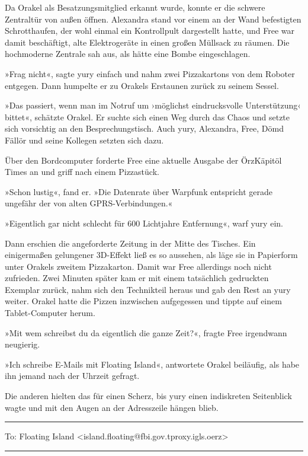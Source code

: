 Da Orakel als Besatzungsmitglied erkannt wurde, konnte er die schwere Zentraltür von außen öffnen. Alexandra stand vor einem an der Wand befestigten Schrotthaufen, der wohl einmal ein Kontrollpult dargestellt hatte, und Free war damit beschäftigt, alte Elektrogeräte in einen großen Müllsack zu räumen. Die hochmoderne Zentrale sah aus, als hätte eine Bombe eingeschlagen.

»Frag nicht«, sagte yury einfach und nahm zwei Pizzakartons von dem Roboter entgegen. Dann humpelte er zu Orakels Erstaunen zurück zu seinem Sessel.

»Das passiert, wenn man im Notruf um ›möglichst eindrucksvolle Unterstützung‹ bittet«, schätzte Orakel. Er suchte sich einen Weg durch das Chaos und setzte sich vorsichtig an den Besprechungstisch. Auch yury, Alexandra, Free, Dömd Fällör und seine Kollegen setzten sich dazu.

Über den Bordcomputer forderte Free eine aktuelle Ausgabe der ÖrzKäpitöl Times an und griff nach einem Pizzastück.

»Schon lustig«, fand er. »Die Datenrate über Warpfunk entspricht gerade ungefähr der von alten GPRS-Verbindungen.«

»Eigentlich gar nicht schlecht für 600 Lichtjahre Entfernung«, warf yury ein.

Dann erschien die angeforderte Zeitung in der Mitte des Tisches. Ein einigermaßen gelungener 3D-Effekt ließ es so aussehen, als läge sie in Papierform unter Orakels zweitem Pizzakarton. Damit war Free allerdings noch nicht zufrieden. Zwei Minuten später kam er mit einem tatsächlich gedruckten Exemplar zurück, nahm sich den Technikteil heraus und gab den Rest an yury weiter. Orakel hatte die Pizzen inzwischen aufgegessen und tippte auf einem Tablet-Computer herum.

»Mit wem schreibst du da eigentlich die ganze Zeit?«, fragte Free irgendwann neugierig.

»Ich schreibe E-Mails mit Floating Island«, antwortete Orakel beiläufig, als habe ihn jemand nach der Uhrzeit gefragt.

Die anderen hielten das für einen Scherz, bis yury einen indiskreten Seitenblick wagte und mit den Augen an der Adresszeile hängen blieb.

\noindent \parbox{\textwidth}{ \vspace{3ex} \hrule \vspace{3ex}

    \begin{footnotesize}
    \begin{ttfamily}

\noindent To: Floating Island <island.floating@fbi.gov.tproxy.igls.oerz>

    \end{ttfamily}
    \end{footnotesize}

\vspace{3ex} \hrule \vspace{3ex} }

